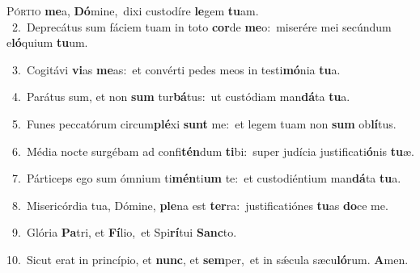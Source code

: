 \lettrine{\initial\textcolor{\initialcolor}{P}}{órtio} \textbf{me}\-a, \textbf{Dó}\-mine,~\star dixi custodíre \textbf{le}\-gem \textbf{tu}\-am.\\
{\numbfont\textcolor{\numbcolor}{~2.}}~Deprecátus sum fáciem tuam in toto \textbf{cor}\-de \textbf{me}\-o:~\star miserére mei secúndum e\-\textbf{ló}\-quium \textbf{tu}\-um.\par
{\numbfont\textcolor{\numbcolor}{~3.}}~Cogitávi \textbf{vi}\-as \textbf{me}\-as:~\star et convérti pedes meos in testi\-\textbf{mó}\-nia \textbf{tu}\-a.\par
{\numbfont\textcolor{\numbcolor}{~4.}}~Parátus sum, et non \textbf{sum} tur\-\textbf{bá}\-tus:~\star ut custódiam man\-\textbf{dá}\-ta \textbf{tu}\-a.\par
{\numbfont\textcolor{\numbcolor}{~5.}}~Funes peccatórum circum\-\textbf{plé}\-xi \textbf{sunt} me:~\star et legem tuam non \textbf{sum} ob\-\textbf{lí}\-tus.\par
{\numbfont\textcolor{\numbcolor}{~6.}}~Média nocte surgébam ad confi\-\textbf{tén}\-dum \textbf{ti}\-bi:~\star super judícia justificati\-\textbf{ó}\-nis \textbf{tu}\-æ.\par
{\numbfont\textcolor{\numbcolor}{~7.}}~Párticeps ego sum ómnium ti\-\textbf{mén}\-ti\textbf{um} te:~\star et custodiéntium man\-\textbf{dá}\-ta \textbf{tu}\-a.\par
{\numbfont\textcolor{\numbcolor}{~8.}}~Misericórdia tua, Dómine, \textbf{ple}\-na est \textbf{ter}\-ra:~\star justificatiónes \textbf{tu}\-as \textbf{do}\-ce me.\par
{\numbfont\textcolor{\numbcolor}{~9.}}~Glória \textbf{Pa}\-tri, et \textbf{Fí}\-lio,~\star et Spi\-\textbf{rí}\-tui \textbf{Sanc}\-to.\par
{\numbfont\textcolor{\numbcolor}{10.}}~Sicut erat in princípio, et \textbf{nunc}\-, et \textbf{sem}\-per,~\star et in sǽcula sæcu\-\textbf{ló}\-rum. \textbf{A}\-men.\par
